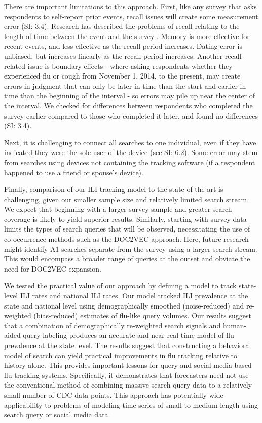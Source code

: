 \documentclass[fleqn,10pt]{wlscirep}
\begin{document}
There are important limitations to this approach. First, like any survey that asks respondents to self-report prior events, recall issues will create some measurement error (SI: 3.4). Research has described the problems of recall relating to the length of time between the event and the survey \cite{rubin1989telescoping}. Memory is more effective for recent events, and less effective as the recall period increases. Dating error is unbiased, but increases linearly as the recall period increases. Another recall-related issue is boundary effects - where asking respondents whether they experienced flu or cough from November 1, 2014, to the present, may create errors in judgment that can only be later in time than the start and earlier in time than the beginning of the interval - so errors may pile up near the center of the interval. We checked for differences between respondents who completed the survey earlier compared to those who completed it later, and found no differences (SI: 3.4). 

Next, it is challenging to connect all searches to one individual, even if they have indicated they were the sole user of the device (see SI: 6.2). Some error may stem from searches using devices not containing the tracking software (if a respondent happened to use a friend or spouse's device). 

Finally, comparison of our ILI tracking model to the state of the art is challenging, given our smaller sample size and relatively limited search stream. We expect that beginning with a larger survey sample and greater search coverage is likely to yield superior results. Similarly, starting with survey data limits the types of search queries that will be observed, necessitating the use of co-occurrence methods such as the DOC2VEC approach. Here, future research might identify A1 searches separate from the survey using a larger search stream. This would encompass a broader range of queries at the outset and obviate the need for DOC2VEC expansion. 

We tested the practical value of our approach by defining a model to track state-level ILI rates and national ILI rates. Our model tracked ILI prevalence at the state and national level using demographically smoothed (noise-reduced) and re-weighted (bias-reduced) estimates of flu-like query volumes. Our results suggest that a combination of demographically re-weighted search signals and human-aided query labeling produces an accurate and near real-time model of flu prevalence at the state level. The results suggest that constructing a behavioral model of search can yield practical improvements in flu tracking relative to history alone. This provides important lessons for query and social media-based flu tracking systems. Specifically, it demonstrates that forecasters need not use the conventional method of combining massive search query data to a relatively small number of CDC data points. This approach has potentially wide applicability to problems of modeling time series of small to medium length using search query or social media data. 
\end{document}
